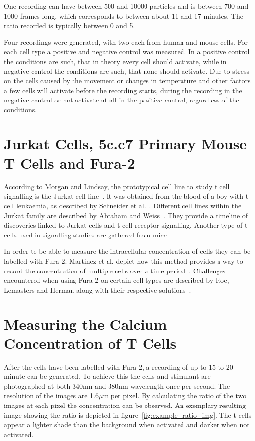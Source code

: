 
One recording can have between 500 and 10000 particles and is between 700 and 1000 frames long, which corresponds to between about 11 and 17 minutes. The ratio recorded is typically between 0 and 5.

Four recordings were generated, with two each from human and mouse cells. For each cell type a positive and negative control was measured. In a positive control the conditions are such, that in theory every cell should activate, while in negative control the conditions are such, that none should activate. Due to stress on the cells caused by the movement or changes in temperature and other factors a few cells will activate before the recording starts, during the recording in the negative control or not activate at all in the positive control, regardless of the conditions.

\section{Jurkat Cells, 5c.c7 Primary Mouse T Cells and Fura-2}
\label{sec:jurkat_cells_primary_mouse_t_cells_and_fura2}

According to Morgan and Lindsay, the prototypical cell line to study t cell signalling is the Jurkat cell line~\cite{morgan2023}. It was obtained from the blood of a boy with t cell leukaemia, as described by Schneider et al.~\cite{schneider1977}. Different cell lines within the Jurkat family are described by Abraham and Weiss~\cite{abraham2004}. They provide a timeline of discoveries linked to Jurkat cells and t cell receptor signalling. Another type of t cells used in signalling studies are gathered from mice.

In order to be able to measure the intracellular \Calcium concentration of cells they can be labelled with Fura-2. Martinez et al. depict how this method provides a way to record the \Calcium concentration of multiple cells over a time period~\cite{martinez2017}. Challenges encountered when using Fura-2 on certain cell types are described by Roe, Lemasters and Herman along with their respective solutions~\cite{roe1990}.

\section{Measuring the Calcium Concentration of T Cells}

After the cells have been labelled with Fura-2, a recording of up to 15 to 20 minute can be generated. To achieve this the cells and stimulant are photographed at both 340nm and 380nm wavelength once per second. The resolution of the images are 1.6$\mu$m per pixel. By calculating the ratio of the two images at each pixel the \Calcium concentration can be observed. An exemplary resulting image showing the ratio is depicted in figure~\ref{fig:example_ratio_img}. The t cells appear a lighter shade than the background when activated and darker when not activated.

